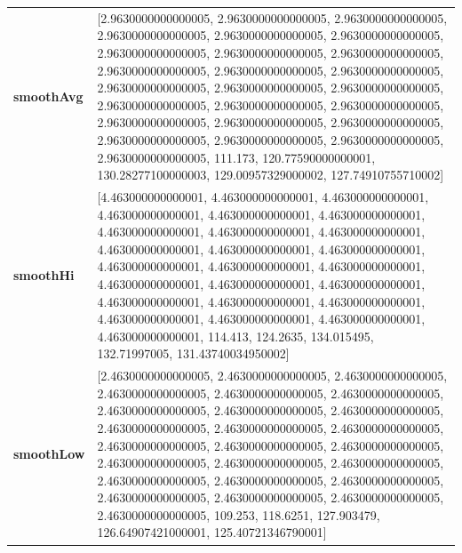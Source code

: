 						\begin{table}[H]
							\centering
							\begin{tabularx}{\textwidth}{lX}
		\textbf{smoothAvg}&  [2.9630000000000005, 2.9630000000000005, 2.9630000000000005, 2.9630000000000005, 2.9630000000000005, 2.9630000000000005, 2.9630000000000005, 2.9630000000000005, 2.9630000000000005, 2.9630000000000005, 2.9630000000000005, 2.9630000000000005, 2.9630000000000005, 2.9630000000000005, 2.9630000000000005, 2.9630000000000005, 2.9630000000000005, 2.9630000000000005, 2.9630000000000005, 2.9630000000000005, 2.9630000000000005, 2.9630000000000005, 2.9630000000000005, 2.9630000000000005, 2.9630000000000005, 111.173, 120.77590000000001, 130.28277100000003, 129.00957329000002, 127.74910755710002] \\
		\textbf{smoothHi}& [4.463000000000001, 4.463000000000001, 4.463000000000001, 4.463000000000001, 4.463000000000001, 4.463000000000001, 4.463000000000001, 4.463000000000001, 4.463000000000001, 4.463000000000001, 4.463000000000001, 4.463000000000001, 4.463000000000001, 4.463000000000001, 4.463000000000001, 4.463000000000001, 4.463000000000001, 4.463000000000001, 4.463000000000001, 4.463000000000001, 4.463000000000001, 4.463000000000001, 4.463000000000001, 4.463000000000001, 4.463000000000001, 114.413, 124.2635, 134.015495, 132.71997005, 131.43740034950002] \\
		\textbf{smoothLow} &[2.4630000000000005, 2.4630000000000005, 2.4630000000000005, 2.4630000000000005, 2.4630000000000005, 2.4630000000000005, 2.4630000000000005, 2.4630000000000005, 2.4630000000000005, 2.4630000000000005, 2.4630000000000005, 2.4630000000000005, 2.4630000000000005, 2.4630000000000005, 2.4630000000000005, 2.4630000000000005, 2.4630000000000005, 2.4630000000000005, 2.4630000000000005, 2.4630000000000005, 2.4630000000000005, 2.4630000000000005, 2.4630000000000005, 2.4630000000000005, 2.4630000000000005, 109.253, 118.6251, 127.903479, 126.64907421000001, 125.40721346790001]\\
		
	\end{tabularx} 
\end{table}
